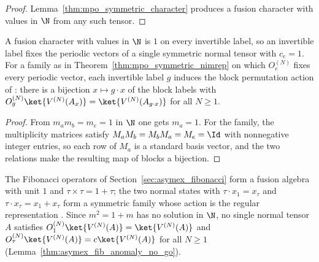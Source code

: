 \begin{proof}
    \leanok
    Lemma~\ref{thm:mpo_symmetric_character} produces a fusion character
    with values in $\N$ from any such tensor.
\end{proof}

\begin{lemma}%
    \label{thm:mpo_invertible_labels}
    \leanok
    A fusion character with values in $\N$ is $1$ on every invertible label,
    so an invertible label fixes the periodic vectors of a single symmetric
    normal tensor with $c_e=1$. For a family as in
    Theorem~\ref{thm:mpo_symmetric_nimrep} on which $O_e^{(N)}$ fixes every
    periodic vector, each invertible label $g$ induces the block permutation
    action of \cite[Section~4]{GarreRubio2023MPOSym}: there is a bijection
    $x\mapsto g\cdot x$ of the block labels with
    $O_g^{(N)}\ket{V^{(N)}(A_x)}=\ket{V^{(N)}(A_{g\cdot x})}$ for all
    $N\geq1$.
\end{lemma}

\begin{proof}
    \leanok
    From $m_am_b=m_e=1$ in $\N$ one gets $m_a=1$. For the family, the
    multiplicity matrices satisfy $M_aM_b=M_bM_a=M_e=\Id$ with nonnegative
    integer entries, so each row of $M_a$ is a standard basis vector, and the
    two relations make the resulting map of blocks a bijection.
\end{proof}



\begin{example}[Fibonacci]%
    \label{ex:mpo_symmetry_fibonacci}
    \leanok
    The Fibonacci operators of Section~\ref{sec:asymex_fibonacci} form a
    fusion algebra with unit $1$ and $\tau\times\tau=1+\tau$; the two normal
    states with $\tau\cdot x_1=x_\tau$ and $\tau\cdot x_\tau=x_1+x_\tau$ form
    a symmetric family whose action is the regular representation
    \cite[Section~6]{GarreRubio2023MPOSym}. Since $m^2=1+m$ has no solution
    in $\N$, no single normal tensor $A$ satisfies
    $O_1^{(N)}\ket{V^{(N)}(A)}=\ket{V^{(N)}(A)}$ and
    $O_\tau^{(N)}\ket{V^{(N)}(A)}=c\ket{V^{(N)}(A)}$ for all $N\geq1$
    (Lemma~\ref{thm:asymex_fib_anomaly_no_go}).
\end{example}

